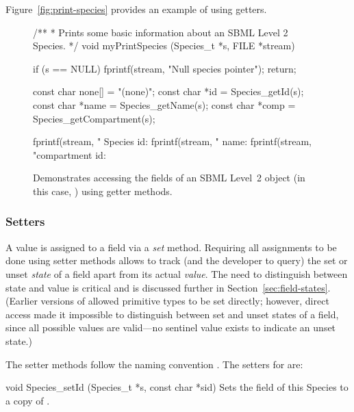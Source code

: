 \documentclass{sbmlmanual}
\begin{document}
Figure~\vref{fig:print-species} provides an example of using getters. 

\begin{figure}[thb]
  \begin{boxedCodeVerbatim}
/** 
 * Prints some basic information about an SBML Level 2 Species.
 */
void
myPrintSpecies (Species_t *s, FILE *stream)
{
  if (s == NULL)
  {
    fprintf(stream, "Null species pointer\n");
    return;
  }

  const char none[] = "(none)";
  const char *id      = Species_getId(s);
  const char *name    = Species_getName(s);
  const char *comp    = Species_getCompartment(s);

  fprintf(stream, "      Species id: %
  fprintf(stream, "             name: %
  fprintf(stream, "compartment id: %
}
  \end{boxedCodeVerbatim}
  \caption{Demonstrates accessing the fields of an SBML Level~2 object
  (in this case, ) using getter methods.}
  \label{fig:print-species}
\end{figure}


\subsubsection{Setters}

A value is assigned to a field via a \emph{set} method.  Requiring all
assignments to be done using setter methods allows \libsbml{} to track (and
the developer to query) the set or unset \emph{state} of a field apart from
its actual \emph{value}.  The need to distinguish between state and value
is critical and is discussed further in Section~\ref{sec:field-states}.
(Earlier versions of \libsbml{} allowed primitive types to be set directly;
however, direct access made it impossible to distinguish between set and
unset states of a field, since all possible values are valid---no sentinel
value exists to indicate an unset state.)

The setter methods follow the naming convention .
The setters for  are:


\begin{methoddef}{void Species\_setId (Species\_t *s, const char *sid)}
  Sets the  field of this Species to a copy of .
\end{methoddef}
\end{document}
